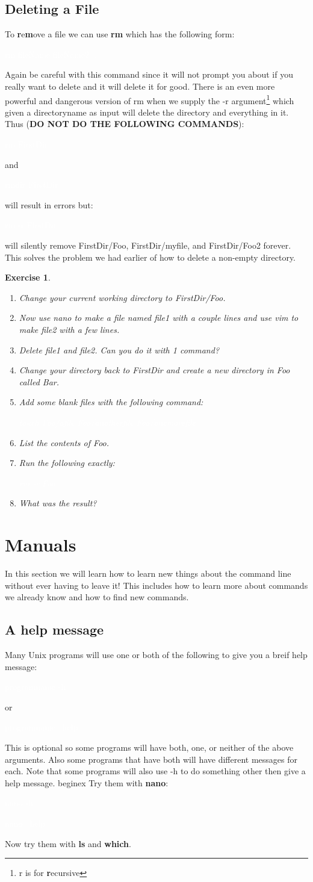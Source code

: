 \documentclass{book}
\newcommand{\commandline}[1]{\begin{center} \colorbox{Dark}{\textcolor{white}{#1}} \end{center}}
\newtheorem{ex}{Exercise}[chapter]
\begin{document}
\subsection{Deleting a File}
To \textbf{r}e\textbf{m}ove a file we can use \textbf{rm} which has the following form:
\commandline{rm fileName fileName2 ...}
Again be careful with this command since it will not prompt you about if you really want to delete and it will delete it for good. There is an even more powerful and dangerous version of rm when we supply the -r argument\footnote{r is for \textbf{r}ecursive} which given a directoryname as input will delete the directory and everything in it. 
Thus (\textbf{DO NOT DO THE FOLLOWING COMMANDS}):
\commandline{rm FirstDir}
and
\commandline{rmdir FirstDir}
will result in errors but:
\commandline{rm -r FirstDir} 
will silently remove FirstDir/Foo, FirstDir/myfile, and FirstDir/Foo2 forever. This solves the problem we had earlier of how to delete a non-empty directory. 
\begin{ex}
	\begin{enumerate}
		\item Change your current working directory to FirstDir/Foo.
		\item Now use nano to make a file named file1 with a couple lines and use vim to make file2 with a few lines.
		\item Delete file1 and file2. Can you do it with 1 command?
		\item Change your directory back to FirstDir and create a new directory in Foo called Bar.
		\item Add some blank files with the following command:
		    \commandline{touch Foo/afile Foo/anotherfile Foo/onemorefile}
		\item List the contents of Foo.
		\item Run the following exactly:
		    \commandline{rm -r Foo}
		\item What was the result?
	\end{enumerate}
\end{ex}


\section{Manuals}
In this section we will learn how to learn new things about the command line without ever having to leave it! This includes how to learn more about commands we already know and how to find new commands.
\subsection{ A help message}
Many Unix programs will use one or both of the following to give you a breif help message:
\commandline{programname -h}
or
\commandline{programname --help}
This is optional so some programs will have both, one, or neither of the above arguments. Also some programs that have both will have different messages for each. Note that some programs will also use -h to do something other then give a help message.
begin{ex}
Try them with \textbf{nano}:
	\commandline{nano -h}
	\commandline{nano --help}
	Now try them with \textbf{ls} and \textbf{which}.
\end{document}
